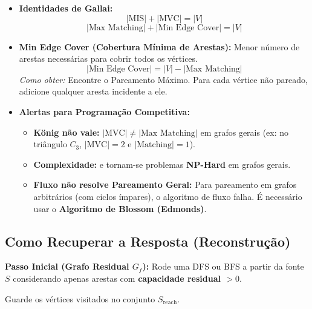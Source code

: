 \begin{itemize}
    \item \textbf{Identidades de Gallai:}
    \[ |\text{MIS}| + |\text{MVC}| = |V| \]
    \[ |\text{Max Matching}| + |\text{Min Edge Cover}| = |V| \]

    \item \textbf{Min Edge Cover (Cobertura Mínima de Arestas):}
    Menor número de arestas necessárias para cobrir todos os vértices.
    \[ |\text{Min Edge Cover}| = |V| - |\text{Max Matching}| \]
    \textit{Como obter:} Encontre o Pareamento Máximo. Para cada vértice não pareado, adicione qualquer aresta incidente a ele.

    \item \textbf{Alertas para Programação Competitiva:}
    \begin{itemize}
        \item \textbf{König não vale:} $|\text{MVC}| \neq |\text{Max Matching}|$ em grafos gerais (ex: no triângulo $C_3$, $|\text{MVC}| = 2$ e $|\text{Matching}| = 1$).
        \item \textbf{Complexidade:}  e  tornam-se problemas \textbf{NP-Hard} em grafos gerais.
        \item \textbf{Fluxo não resolve Pareamento Geral:} Para pareamento em grafos arbitrários (com ciclos ímpares), o algoritmo de fluxo falha. É necessário usar o \textbf{Algoritmo de Blossom (Edmonds)}.
    \end{itemize}
\end{itemize}

\subsection{Como Recuperar a Resposta (Reconstrução)}

\textbf{Passo Inicial (Grafo Residual $G_f$):}
Rode uma DFS ou BFS a partir da fonte $S$ considerando apenas arestas com \textbf{capacidade residual $> 0$}. 

Guarde os vértices visitados no conjunto $S_{\text{reach}}$.


